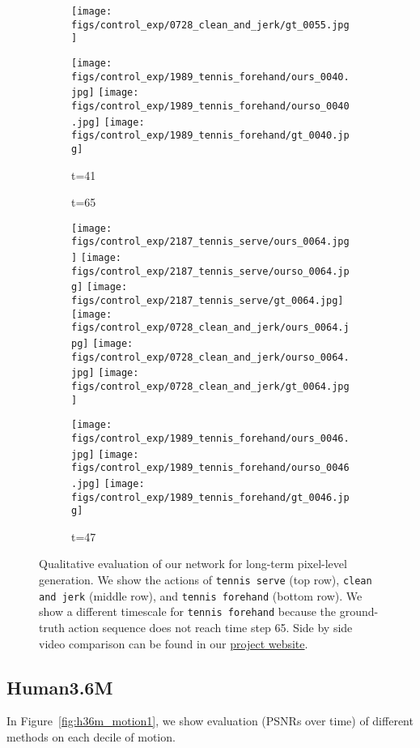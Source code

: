 \documentclass{article}
\begin{document}
\begin{appendix}
\begin{figure*}[!thbp]
\begin{subfigure}{0.12\linewidth}
  		\vspace{.2cm}
  		\texttt{[image: figs/control\_exp/0728\_clean\_and\_jerk/gt\_0055.jpg]}
  		\caption*{t=41}
  		\vspace{-7pt}
  		\texttt{[image: figs/control\_exp/1989\_tennis\_forehand/ours\_0040.jpg]}
  		\texttt{[image: figs/control\_exp/1989\_tennis\_forehand/ourso\_0040.jpg]}
  		\vspace{.2cm}
  		\texttt{[image: figs/control\_exp/1989\_tennis\_forehand/gt\_0040.jpg]}
	\end{subfigure}
	\begin{subfigure}{0.12\linewidth}
        \caption*{t=65}
        \vspace{-7pt}
	    \texttt{[image: figs/control\_exp/2187\_tennis\_serve/ours\_0064.jpg]}
	    \texttt{[image: figs/control\_exp/2187\_tennis\_serve/ourso\_0064.jpg]}
	    \vspace{.2cm}
  		\texttt{[image: figs/control\_exp/2187\_tennis\_serve/gt\_0064.jpg]}
  		\texttt{[image: figs/control\_exp/0728\_clean\_and\_jerk/ours\_0064.jpg]}
  		\texttt{[image: figs/control\_exp/0728\_clean\_and\_jerk/ourso\_0064.jpg]}
  		\vspace{.2cm}
  		\texttt{[image: figs/control\_exp/0728\_clean\_and\_jerk/gt\_0064.jpg]}
  		\caption*{t=47}
  		\vspace{-7pt}
  		\texttt{[image: figs/control\_exp/1989\_tennis\_forehand/ours\_0046.jpg]}
  		\texttt{[image: figs/control\_exp/1989\_tennis\_forehand/ourso\_0046.jpg]}
  		\vspace{.2cm}
  		\texttt{[image: figs/control\_exp/1989\_tennis\_forehand/gt\_0046.jpg]}
	\end{subfigure}
    \caption{Qualitative evaluation of our network for long-term pixel-level generation. We show the actions of \texttt{tennis serve} (top row), \texttt{clean and jerk} (middle row), and \texttt{tennis forehand} (bottom row). We show a different timescale for \texttt{tennis forehand} because the ground-truth action sequence does not reach time step 65. Side by side video comparison can be found in our \href{https://goo.gl/U7UOfy}{project website}.}
\label{fig:penngtft2}
\vspace{-40pt}
\end{figure*}

\clearpage

\subsection{Human3.6M}\label{supp:h36m}
In Figure~\ref{fig:h36m_motion1}, we show evaluation (PSNRs over time) of different methods on each decile of motion.


\end{appendix}
\end{document}
